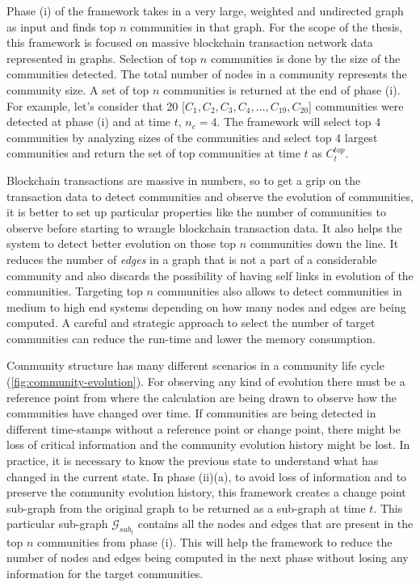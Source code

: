 Phase (i) of the framework takes in a very large, weighted and undirected graph as input and finds top $n$ communities in that graph. For the scope of the thesis, this framework is focused on massive blockchain transaction network data represented in graphs. Selection of top $n$ communities is done by the size of the communities detected. The total number of nodes in a community represents the community size. A set of top $n$ communities is returned at the end of phase (i). For example, let's consider that 20 [$C_1, C_2, C_3, C_4, \ldots , C_{19}, C_{20}$] communities were detected at phase (i) and at time $t$, $n_{c} = 4$. The framework will select top $4$ communities by analyzing sizes of the communities and select top $4$ largest communities and return the set of top communities at time  $t$ as $C_t^{top}$. 

Blockchain transactions are massive in numbers, so to get a grip on the transaction data to detect communities and observe the evolution of communities, it is better to set up particular properties like the number of communities to observe before starting to wrangle blockchain transaction data. It also helps the system to detect better evolution on those top $n$ communities down the line. It reduces the number of \textit{edges} in a graph that is not a part of a considerable community and also discards the possibility of having self links in evolution of the communities. Targeting top $n$ communities also allows to detect communities in medium to high end systems depending on how many nodes and edges are being computed. A careful and strategic approach to select the number of target communities can reduce the run-time and lower the memory consumption.

Community structure has many different scenarios in a community life cycle (\ref{fig:community-evolution}). For observing any kind of evolution there must be a reference point from where the calculation are being drawn to observe how the communities have changed over time. If communities are being detected in different time-stamps without a reference point or change point, there might be loss of critical information and the community evolution history might be lost. In practice, it is necessary to know the previous state to understand what has changed in the current state. In phase (ii)(a), to avoid loss of information and to preserve the community evolution history, this framework creates a change point sub-graph from the original graph to be returned as a sub-graph at time $t$. This particular sub-graph $\mathcal{G}_{sub_{t}}$ contains all the nodes and edges that are present in the top $n$ communities from phase (i). This will help the framework to reduce the number of nodes and edges being computed in the next phase without losing any information for the target communities.


